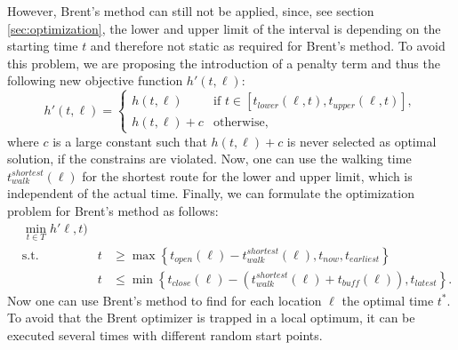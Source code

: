  However, Brent's method can still not be applied, since, see section \ref{sec:optimization}, the lower and upper limit of the interval is depending on the starting time $t$ and therefore not static as required for Brent's method. To avoid this problem, we are proposing the introduction of a penalty term and thus the following new objective function $h'(t,\ell)$:
 \begin{equation}
 \label{eq:optimal-time-penality}
 h'(t,\ell) = \begin{cases}
 h(t,\ell) & \text{if }t \in [t_{lower}(\ell, t), t_{upper}(\ell, t)],\\
 h(t,\ell)  + c & \text{otherwise,}
 \end{cases}
 \end{equation}
 where $c$ is a large constant such that $h(t,\ell) + c$ is never selected as optimal solution, if the constrains are violated. Now, one can use the walking time $t_{walk}^{shortest}(\ell)$  for the shortest route for the lower and upper limit, which is independent of the actual time. Finally, we can formulate the optimization problem for Brent's method as follows:
 \begin{subequations}
 	\label{eq:brent-optimization-problem}
 	\begin{alignat}{2}
 	&\min_{t \in T} h'\ell, t) && \\
 	&\text{s.t.} & t & \geq \max\left\lbrace  t_{open}(\ell)-t_{walk}^{shortest}(\ell), t_{now}, t_{earliest} \right\rbrace \\
 	& & t &\leq \min\left\lbrace  t_{close}(\ell)- \left(t_{walk}^{shortest}(\ell) + t_{buff}(\ell)\right), t_{latest} \right\rbrace.
 	\end{alignat}
 \end{subequations}
Now one can use Brent's method to find for each location $\ell$ the optimal time $t^*$. To avoid that the Brent optimizer is trapped in a local optimum, it can be executed several times with different random start points.
